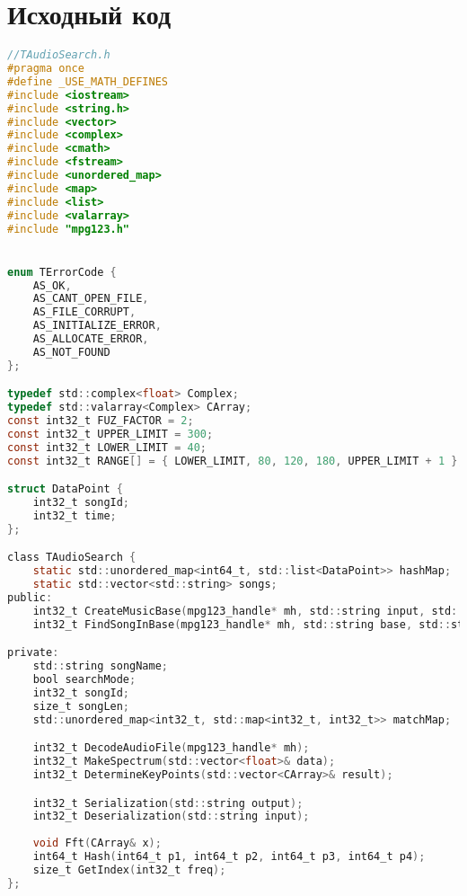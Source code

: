 \section{Исходный код}

\begin{lstlisting}[language=C, mathescape]
//TAudioSearch.h
#pragma once 
#define _USE_MATH_DEFINES
#include <iostream>
#include <string.h>
#include <vector>
#include <complex>
#include <cmath>
#include <fstream>
#include <unordered_map>
#include <map>
#include <list>
#include <valarray>  
#include "mpg123.h"


enum TErrorCode {
    AS_OK,
    AS_CANT_OPEN_FILE,
    AS_FILE_CORRUPT,
    AS_INITIALIZE_ERROR,
    AS_ALLOCATE_ERROR, 
    AS_NOT_FOUND
};

typedef std::complex<float> Complex;
typedef std::valarray<Complex> CArray;
const int32_t FUZ_FACTOR = 2;
const int32_t UPPER_LIMIT = 300;
const int32_t LOWER_LIMIT = 40;
const int32_t RANGE[] = { LOWER_LIMIT, 80, 120, 180, UPPER_LIMIT + 1 };

struct DataPoint {
    int32_t songId;
    int32_t time;
};

class TAudioSearch {
    static std::unordered_map<int64_t, std::list<DataPoint>> hashMap;
    static std::vector<std::string> songs;
public:
    int32_t CreateMusicBase(mpg123_handle* mh, std::string input, std::string output);
    int32_t FindSongInBase(mpg123_handle* mh, std::string base, std::string intput, std::string output);

private:
    std::string songName;
    bool searchMode;
    int32_t songId;
    size_t songLen;
    std::unordered_map<int32_t, std::map<int32_t, int32_t>> matchMap;

    int32_t DecodeAudioFile(mpg123_handle* mh);
    int32_t MakeSpectrum(std::vector<float>& data);
    int32_t DetermineKeyPoints(std::vector<CArray>& result);

    int32_t Serialization(std::string output);
    int32_t Deserialization(std::string input);
    
    void Fft(CArray& x);
    int64_t Hash(int64_t p1, int64_t p2, int64_t p3, int64_t p4);
    size_t GetIndex(int32_t freq);
};
\end{lstlisting}

